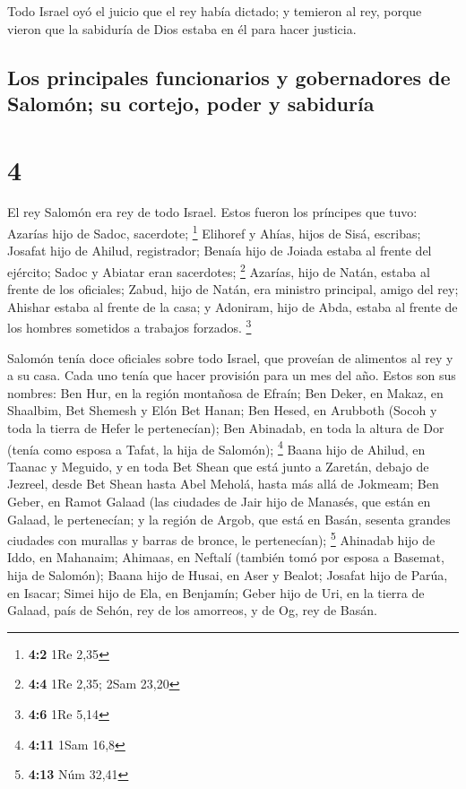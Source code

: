  Todo Israel oyó el juicio que el rey había dictado; y
temieron al rey, porque vieron que la sabiduría de Dios estaba en él
para hacer justicia.

\hypertarget{los-principales-funcionarios-y-gobernadores-de-salomuxf3n-su-cortejo-poder-y-sabiduruxeda}{%
\subsection{Los principales funcionarios y gobernadores de Salomón; su
cortejo, poder y
sabiduría}\label{los-principales-funcionarios-y-gobernadores-de-salomuxf3n-su-cortejo-poder-y-sabiduruxeda}}

\hypertarget{section-3}{%
\section{4}\label{section-3}}

 El rey Salomón era rey de todo Israel. 
Estos fueron los príncipes que tuvo: Azarías hijo de Sadoc, sacerdote;
\footnote{\textbf{4:2} 1Re 2,35}  Elihoref y Ahías, hijos
de Sisá, escribas; Josafat hijo de Ahilud, registrador; 
Benaía hijo de Joiada estaba al frente del ejército; Sadoc y Abiatar
eran sacerdotes; \footnote{\textbf{4:4} 1Re 2,35; 2Sam 23,20}
 Azarías, hijo de Natán, estaba al frente de los
oficiales; Zabud, hijo de Natán, era ministro principal, amigo del rey;
 Ahishar estaba al frente de la casa; y Adoniram, hijo de
Abda, estaba al frente de los hombres sometidos a trabajos forzados.
\footnote{\textbf{4:6} 1Re 5,14}

 Salomón tenía doce oficiales sobre todo Israel, que
proveían de alimentos al rey y a su casa. Cada uno tenía que hacer
provisión para un mes del año.  Estos son sus nombres: Ben
Hur, en la región montañosa de Efraín;  Ben Deker, en
Makaz, en Shaalbim, Bet Shemesh y Elón Bet Hanan;  Ben
Hesed, en Arubboth (Socoh y toda la tierra de Hefer le pertenecían);
 Ben Abinadab, en toda la altura de Dor (tenía como
esposa a Tafat, la hija de Salomón); \footnote{\textbf{4:11} 1Sam 16,8}
 Baana hijo de Ahilud, en Taanac y Meguido, y en toda Bet
Shean que está junto a Zaretán, debajo de Jezreel, desde Bet Shean hasta
Abel Meholá, hasta más allá de Jokmeam;  Ben Geber, en
Ramot Galaad (las ciudades de Jair hijo de Manasés, que están en Galaad,
le pertenecían; y la región de Argob, que está en Basán, sesenta grandes
ciudades con murallas y barras de bronce, le pertenecían); \footnote{\textbf{4:13}
  Núm 32,41}  Ahinadab hijo de Iddo, en Mahanaim;
 Ahimaas, en Neftalí (también tomó por esposa a Basemat,
hija de Salomón);  Baana hijo de Husai, en Aser y Bealot;
 Josafat hijo de Parúa, en Isacar;  Simei
hijo de Ela, en Benjamín;  Geber hijo de Uri, en la
tierra de Galaad, país de Sehón, rey de los amorreos, y de Og, rey de
Basán.

